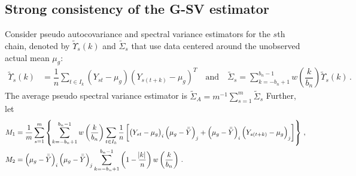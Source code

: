 \documentclass[12pt]{article}
\newcommand{\E}{\mathbb{E}}
\newcommand{\Var}{\text{Var}}
\theoremstyle{remark}
\begin{document}




\subsection{Strong consistency of the G-SV estimator} \label{appendix:strong_consis}


Consider pseudo autocovariance and spectral variance estimators for the $s$th chain, denoted by $\tilde{\Upsilon}_s(k)$ and $\tilde{\Sigma}_s$ that use data centered around the unobserved actual mean $\mu_g$:
\begin{align*}
    \tilde{\Upsilon}_s(k) &= \dfrac{1}{n}\sum_{t \in I_k}(Y_{st}-\mu_g)(Y_{s(t+k)}-\mu_g)^T  \quad \text{and} \quad 
    \tilde{\Sigma}_s = \sum_{k=-b_n+1}^{b_n-1}w\left(\dfrac{k}{b_n}\right)\tilde{\Upsilon}_s(k) \,.
\end{align*}
%
The average pseudo spectral variance estimator is $\tilde{\Sigma}_A = m^{-1}\sum_{s=1}^{m}\tilde{\Sigma}_s$
% 
Further, let
\begin{align*}
  M_1 & = \dfrac{1}{m}\sum\limits_{s=1}^{m}\left\{\sum\limits_{k=-b_n+1}^{b_n-1}w\left(\dfrac{k}{b_n}\right)\sum\limits_{t \in I_k}\dfrac{1}{n}\left[ \left(Y_{st}-\mu_g \right)_i   \left(\mu_g-\bar{\bar{Y}} \right)_j +    \left(\mu_g-\bar{\bar{Y}} \right)_i  \left(Y_{s(t+k)}-\mu_g \right)_j \right]\right\}\,, \\ 
M_2 &= \left(\mu_g-\bar{\bar{Y}} \right)_i   \left(\mu_g-\bar{\bar{Y}} \right)_j\sum\limits_{k=-b_n+1}^{b_n-1}\left(1-\dfrac{\abs{k}}{n}\right)w\left(\dfrac{k}{b_n}\right)\,.
\end{align*}
\end{document}
